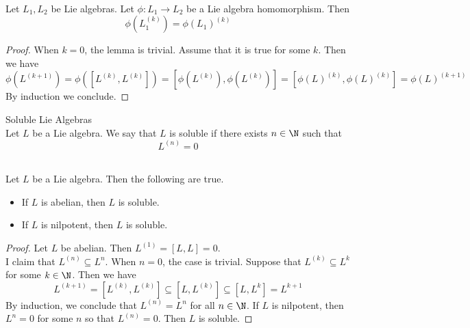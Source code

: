 \documentclass[a4paper]{article}
\begin{document}
\begin{lmm}{}{} \\Let $L_1,L_2$ be Lie algebras. Let $\phi:L_1\to L_2$ be a Lie algebra homomorphism. Then $$\phi(L_1^{(k)})=\phi(L_1)^{(k)}$$ 
\begin{proof}
When $k=0$, the lemma is trivial. Assume that it is true for some $k$. Then we have $$\phi(L^{(k+1)})=\phi([L^{(k)},L^{(k)}])=[\phi(L^{(k)}),\phi(L^{(k)})]=[\phi(L)^{(k)},\phi(L)^{(k)}]=\phi(L)^{(k+1)}$$ By induction we conclude. 
\end{proof}
\end{lmm}

\begin{defn}{Soluble Lie Algebras}{} \\Let $L$ be a Lie algebra. We say that $L$ is soluble if there exists $n\in\N$ such that $$L^{(n)}=0$$
\end{defn}

\begin{lmm}{}{} \\Let $L$ be a Lie algebra. Then the following are true. 
\begin{itemize}
\item If $L$ is abelian, then $L$ is soluble. 
\item If $L$ is nilpotent, then $L$ is soluble. 
\end{itemize} 
\begin{proof}
Let $L$ be abelian. Then $L^{(1)}=[L,L]=0$. \\

I claim that $L^{(n)}\subseteq L^n$. When $n=0$, the case is trivial. Suppose that $L^{(k)}\subseteq L^k$ for some $k\in\N$. Then we have $$L^{(k+1)}=[L^{(k)},L^{(k)}]\subseteq[L,L^{(k)}]\subseteq[L,L^k]=L^{k+1}$$ By induction, we conclude that $L^{(n)}=L^n$ for all $n\in\N$. If $L$ is nilpotent, then $L^n=0$ for some $n$ so that $L^{(n)}=0$. Then $L$ is soluble. 
\end{proof}
\end{lmm}
\end{document}
